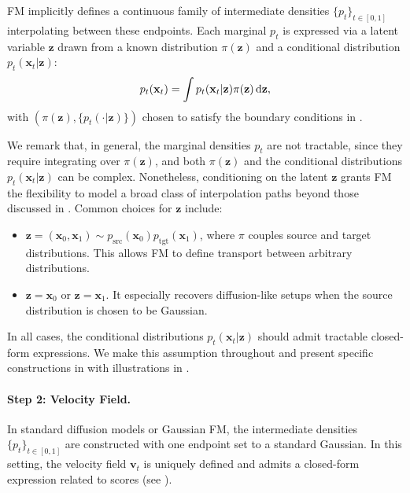 FM implicitly defines a continuous family of intermediate densities $\{ p_t \}_{t \in [0,1]}$ interpolating between these endpoints. Each marginal $ p_t $ is expressed via a latent variable $\mathbf{z}$ drawn from a known distribution $\pi(\mathbf{z})$ and a conditional distribution $p_t(\mathbf{x}_t | \mathbf{z})$:
\begin{equation}\label{eq:p_t}
    p_t(\mathbf{x}_t) = \int p_t(\mathbf{x}_t | \mathbf{z}) \pi(\mathbf{z}) \mathop{}\!\mathrm{d} \mathbf{z},
\end{equation}
with $(\pi(\mathbf{z}), \{p_t(\cdot|\mathbf{z})\})$ chosen to satisfy the boundary conditions in .

We remark that, in general, the marginal densities $p_t$ are not tractable, since they require integrating over $\pi(\mathbf{z})$, and both $\pi(\mathbf{z})$ and the conditional distributions $p_t(\mathbf{x}_t|\mathbf{z})$ can be complex.
Nonetheless, conditioning on the latent $\mathbf{z}$ grants FM the flexibility to model a broad class of interpolation paths beyond those discussed in . Common choices for $\mathbf{z}$ include:
\begin{itemize}
    \item {} $\mathbf{z} = (\mathbf{x}_0, \mathbf{x}_1) \sim p_{\text{src}}(\mathbf{x}_0) p_{\text{tgt}}(\mathbf{x}_1)$, where $\pi$ couples source and target distributions. This allows FM to define transport between arbitrary distributions.
    \item {} $\mathbf{z} = \mathbf{x}_0$ or $\mathbf{z} = \mathbf{x}_1$. It especially recovers diffusion-like setups when the source distribution is chosen to be Gaussian.  
\end{itemize}

In all cases, the conditional distributions $ p_t(\mathbf{x}_t|\mathbf{z}) $ should admit tractable closed-form expressions. We make this assumption throughout and present specific constructions in  with illustrations in .


\paragraph{Step 2: Velocity Field.}
In standard diffusion models or Gaussian FM, the intermediate densities $\{p_t\}_{t \in [0,1]}$ are constructed with one endpoint set to a standard Gaussian. In this setting, the velocity field $\mathbf{v}_t$ is uniquely defined and admits a closed-form expression related to scores (see ).

